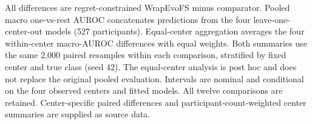 All differences are regret-constrained WrapEvoFS minus comparator. Pooled macro
one-vs-rest AUROC concatenates predictions from the four leave-one-center-out
models (527 participants). Equal-center aggregation averages the four
within-center macro-AUROC differences with equal weights. Both summaries use
the same 2,000 paired resamples within each comparison, stratified by fixed
center and true class (seed 42). The equal-center analysis is post hoc and does
not replace the original pooled evaluation. Intervals are nominal and
conditional on the four observed centers and fitted models. All twelve
comparisons are retained. Center-specific paired differences and
participant-count-weighted center summaries are supplied as source data.
\endgroup
